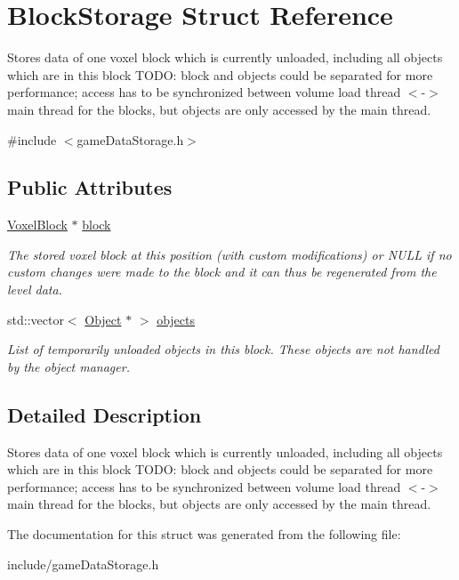 \hypertarget{structBlockStorage}{
\section{\-Block\-Storage \-Struct \-Reference}
\label{df/d48/structBlockStorage}
}


\-Stores data of one voxel block which is currently unloaded, including all objects which are in this block \-T\-O\-D\-O\-: block and objects could be separated for more performance; access has to be synchronized between volume load thread $<$-\/$>$ main thread for the blocks, but objects are only accessed by the main thread.  




{\ttfamily \#include $<$game\-Data\-Storage.\-h$>$}

\subsection*{\-Public \-Attributes}
\begin{DoxyCompactItemize}
\item 
\hypertarget{structBlockStorage_af73dacab5d84baf0f9cddc39479e0b4b}{
\hyperlink{classVoxelBlock}{\-Voxel\-Block} $\ast$ \hyperlink{structBlockStorage_af73dacab5d84baf0f9cddc39479e0b4b}{block}}
\label{df/d48/structBlockStorage_af73dacab5d84baf0f9cddc39479e0b4b}

\begin{DoxyCompactList}\small\item\em \-The stored voxel block at this position (with custom modifications) or \-N\-U\-L\-L if no custom changes were made to the block and it can thus be regenerated from the level data. \end{DoxyCompactList}\item 
\hypertarget{structBlockStorage_a0f533a897292f3f5846df82725c9ee01}{
std\-::vector$<$ \hyperlink{classObject}{\-Object} $\ast$ $>$ \hyperlink{structBlockStorage_a0f533a897292f3f5846df82725c9ee01}{objects}}
\label{df/d48/structBlockStorage_a0f533a897292f3f5846df82725c9ee01}

\begin{DoxyCompactList}\small\item\em \-List of temporarily unloaded objects in this block. \-These objects are not handled by the object manager. \end{DoxyCompactList}\end{DoxyCompactItemize}


\subsection{\-Detailed \-Description}
\-Stores data of one voxel block which is currently unloaded, including all objects which are in this block \-T\-O\-D\-O\-: block and objects could be separated for more performance; access has to be synchronized between volume load thread $<$-\/$>$ main thread for the blocks, but objects are only accessed by the main thread. 

\-The documentation for this struct was generated from the following file\-:\begin{DoxyCompactItemize}
\item 
include/game\-Data\-Storage.\-h\end{DoxyCompactItemize}
